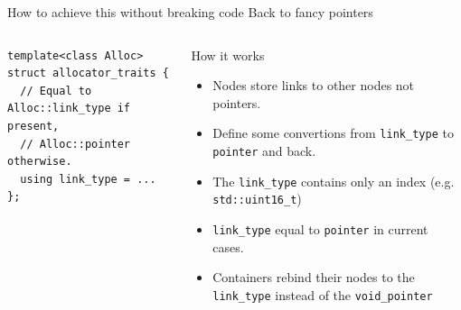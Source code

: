 \documentclass[10pt,aspectratio=169]{beamer}
\begin{document}
\begin{frame}[fragile]
{How to achieve this without breaking code}
{Back to fancy pointers}

\begin{columns}
\begin{column}{0.47\textwidth}
\begin{lstlisting}
template<class Alloc>
struct allocator_traits {
  // Equal to Alloc::link_type if present,
  // Alloc::pointer otherwise.
  using link_type = ...
};
\end{lstlisting}
\end{column}

\begin{column}{0.47\textwidth}
\begin{block}{How it works}
\begin{itemize}
\item Nodes store links to other nodes not pointers.
\item Define some convertions from \texttt{link\_type}
to \texttt{pointer} and back.
\item The \texttt{link\_type} contains
only an index (e.g. \texttt{std::uint16\_t})
\item \texttt{link\_type} equal to \texttt{pointer}
in current cases.
\item Containers rebind their nodes to the \texttt{link\_type}
instead of the \texttt{void\_pointer}
\end{itemize}
\end{block}
\end{column}

\end{columns}

\end{frame}
\end{document}
